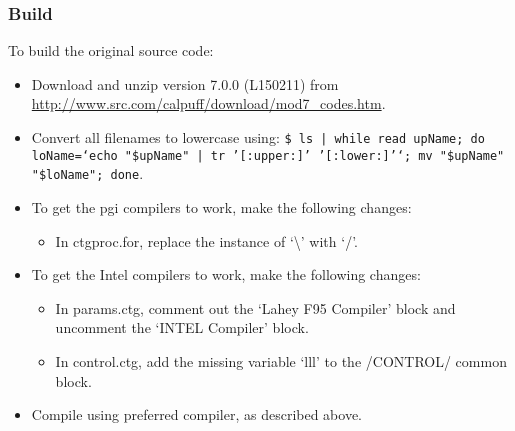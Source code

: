 \documentclass[10pt,a4paper]{article}
\begin{document}
\subsubsection{Build}
To build the original source code:
\begin{itemize}
\item Download and unzip version 7.0.0 (L150211) from \url{http://www.src.com/calpuff/download/mod7_codes.htm}.
\item Convert all filenames to lowercase using: \texttt{\$ ls | while read upName; do loName=`echo "\${upName}" | tr '[:upper:]' '[:lower:]'`; mv "\$upName" "\$loName"; done}.
\item To get the pgi compilers to work, make the following changes:
\begin{itemize}
\item In ctgproc.for, replace the instance of `\textbackslash' with `/'.
\end{itemize}
\item To get the Intel compilers to work, make the following changes:
\begin{itemize}
\item In params.ctg, comment out the `Lahey F95 Compiler' block and uncomment the `INTEL Compiler' block.
\item In control.ctg, add the missing variable `lll' to the /CONTROL/ common block.
\end{itemize}
\item Compile using preferred compiler, as described above.
\end{itemize}
\end{document}
